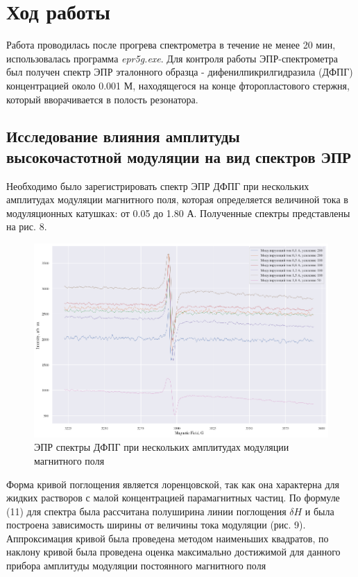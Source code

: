 \documentclass[a4paper,14pt]{article}
\begin{document}
\section{Ход работы}
Работа проводилась после прогрева спектрометра в течение не менее 20 мин, использовалась программа \textit{epr5g.exe}. Для контроля работы ЭПР-спектрометра был получен спектр ЭПР эталонного образца - дифенилпикрилгидразила (ДФПГ) концентрацией около 0.001 М, находящегося на конце фторопластового стержня, который вворачивается в полость резонатора.
\subsection{Исследование влияния амплитуды высокочастотной модуляции на вид спектров ЭПР}
Необходимо было зарегистрировать спектр ЭПР ДФПГ при нескольких амплитудах модуляции магнитного поля, которая определяется величиной тока в модуляционных катушках: от 0.05 до 1.80 А. Полученные спектры представлены на рис. 8. 
\begin{figure}[h]
	\centering
	\includegraphics{рис8}
	\caption{ЭПР спектры ДФПГ при нескольких амплитудах модуляции магнитного поля}
	\label{fig:8}
\end{figure}
\par 
Форма кривой поглощения является лоренцовской, так как она характерна для жидких растворов с малой концентрацией парамагнитных частиц. По формуле (11) для спектра была рассчитана полуширина линии поглощения $ \delta H $ и была построена зависимость ширины от величины тока модуляции (рис. 9). Аппроксимация кривой была проведена методом наименьших квадратов, по наклону кривой была проведена оценка максимально достижимой для данного прибора амплитуды модуляции постоянного магнитного поля
\end{document}
